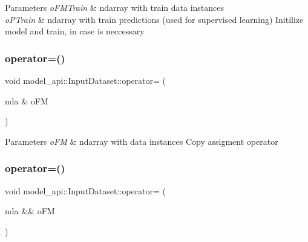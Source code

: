\begin{DoxyParams}{Parameters}
{\em o\+F\+M\+Train} & ndarray with train data instances \\
\hline
{\em o\+P\+Train} & ndarray with train predictions (used for supervised learning) Initilize model and train, in case is neccessary \\
\hline
\end{DoxyParams}
\mbox{\label{classmodel__api_1_1InputDataset_a59c9f5a14675794a67ef0eafa7550d8d}} 
\subsubsection{\texorpdfstring{operator=()}{operator=()}\hspace{0.1cm}{\footnotesize\ttfamily [1/2]}}
{\footnotesize\ttfamily void model\+\_\+api\+::\+Input\+Dataset\+::operator= (\begin{DoxyParamCaption}\item[{nda \&}]{o\+FM }\end{DoxyParamCaption})}


\begin{DoxyParams}{Parameters}
{\em o\+FM} & ndarray with data instances Copy assigment operator \\
\hline
\end{DoxyParams}
\mbox{\label{classmodel__api_1_1InputDataset_a192c20a95f93e03b4c4adb07e8e5e077}} 
\subsubsection{\texorpdfstring{operator=()}{operator=()}\hspace{0.1cm}{\footnotesize\ttfamily [2/2]}}
{\footnotesize\ttfamily void model\+\_\+api\+::\+Input\+Dataset\+::operator= (\begin{DoxyParamCaption}\item[{nda \&\&}]{o\+FM }\end{DoxyParamCaption})\hspace{0.3cm}{\ttfamily [virtual]}}


